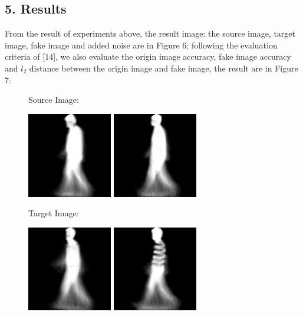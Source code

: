 \documentclass[letterpaper]{article} %
\begin{document}
\subsection{5. Results}
From the result of experiments above, the result image: the source image, target image, fake image and added noise are in Figure 6; following the evaluation criteria of [14],  we also evaluate the origin image accuracy, fake image accuracy and $l_2$ distance between the origin image and fake image, the result are in Figure 7:
\begin{figure}
\centering

Source Image:

\includegraphics[width=0.3\columnwidth]{dl1.png}
\includegraphics[width=0.3\columnwidth]{ex2-source.png}

Target Image:

\includegraphics[width=0.3\columnwidth]{dl2.png}
\includegraphics[width=0.3\columnwidth]{ex2-target.png}


\end{figure}
\end{document}
